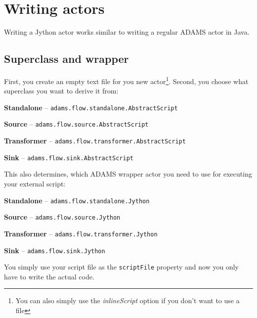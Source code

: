 \documentclass[a4paper]{book}
\begin{document}
\chapter{Writing actors}
Writing a Jython actor works similar to writing a regular ADAMS actor in Java.

\section{Superclass and wrapper}
First, you create an empty text file for you new 
actor\footnote{You can also simply use the \textit{inlineScript} option if you don't 
want to use a file}. Second, you choose what superclass you want to derive it from:
\begin{tight_itemize}
	\item \textbf{Standalone} -- \texttt{adams.flow.standalone.AbstractScript}
	\item \textbf{Source} -- \texttt{adams.flow.source.AbstractScript}
	\item \textbf{Transformer} -- \texttt{adams.flow.transformer.AbstractScript}
	\item \textbf{Sink} -- \texttt{adams.flow.sink.AbstractScript}
\end{tight_itemize}
This also determines, which ADAMS wrapper actor you need to use for executing
your external script:
\begin{tight_itemize}
	\item \textbf{Standalone} -- \texttt{adams.flow.standalone.Jython}
	\item \textbf{Source} -- \texttt{adams.flow.source.Jython}
	\item \textbf{Transformer} -- \texttt{adams.flow.transformer.Jython}
	\item \textbf{Sink} -- \texttt{adams.flow.sink.Jython}
\end{tight_itemize}
You simply use your script file as the \texttt{scriptFile} property and now you
only have to write the actual code.

\newpage
\end{document}
